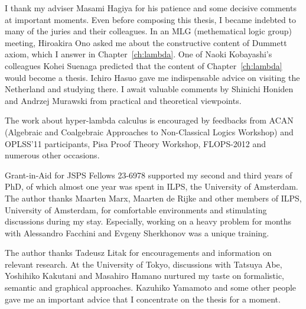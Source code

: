 \begin{acknowledge}
 I thank my adviser Masami Hagiya for his patience and some decisive
 comments at important moments.
 Even before composing this thesis, I became indebted to many of the
 juries and their colleagues.
 In an MLG (methematical logic group) meeting, Hiroakira Ono asked me
 about the constructive content of Dummett axiom, which I answer in
 Chapter~\ref{ch:lambda}.
 One of Naoki Kobayashi's colleagues Kohei Suenaga predicted that the
 content of Chapter~\ref{ch:lambda} would become a thesis.
 Ichiro Hasuo gave me indispensable advice on visiting the Netherland
 and studying there.
 I await valuable comments by Shinichi Honiden and Andrzej Murawski from
 practical and theoretical viewpoints.

 The work about hyper-lambda calculus is encouraged by feedbacks from
 ACAN (Algebraic and Coalgebraic Approaches to
 Non-Classical Logics Workshop) and OPLSS'11 participants,
 Pisa Proof Theory Workshop, FLOPS-2012
 and numerous other occasions.

 Grant-in-Aid for JSPS Fellows 23-6978 supported
 my second and third years of PhD, of which almost one year was spent
 in ILPS, the University of Amsterdam.
 The author thanks Maarten Marx, Maarten de Rijke and other members of ILPS,
 University of Amsterdam, for
 comfortable environments and stimulating discussions during my stay.
 Especially, working on a heavy problem for months with Alessandro
 Facchini and Evgeny Sherkhonov was a unique training.

 The author thanks Tadeusz Litak for encouragements and
 information on relevant research.
 At the University of Tokyo,
 discussions with Tatsuya Abe, Yoshihiko Kakutani and Masahiro Hamano
 nurtured my taste on formalistic, semantic and graphical approaches.
 Kazuhiko Yamamoto and some other people gave me an important advice
 that I concentrate on the thesis for a moment.
\end{acknowledge}
